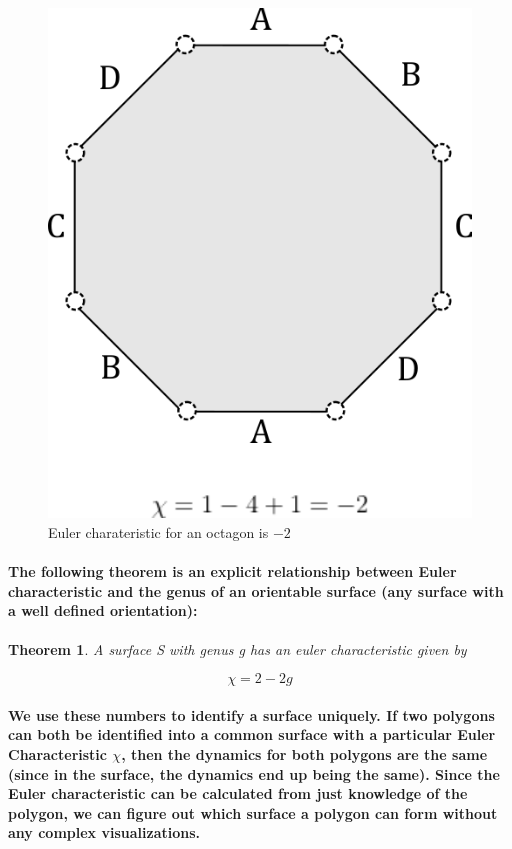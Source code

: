 \documentclass{report}
\newtheorem{theorem}{Theorem}[chapter]
\begin{document}
\begin{center}
\begin{figure}[h]
\includegraphics[scale=0.25]{euca}
\caption{Euler charateristic for an octagon is $-2$}
\end{figure}
\end{center}

\paragraph{The following theorem is an explicit relationship between Euler characteristic and the genus of an orientable surface (any surface with a well defined orientation):}

\begin{theorem}
A surface \textit{S} with genus \textit{g} has an euler characteristic given by
\end{theorem}

\begin{equation}
\chi=2-2g
\end{equation}

\paragraph{We use these numbers to identify a surface uniquely. If two polygons can both be identified into a common surface with a particular Euler Characteristic $\chi$, then the dynamics for both polygons are the same (since in the surface, the dynamics end up being the same). Since the Euler characteristic can be calculated from just knowledge of the polygon, we can figure out which surface a polygon can form without any complex visualizations.}
\end{document}
